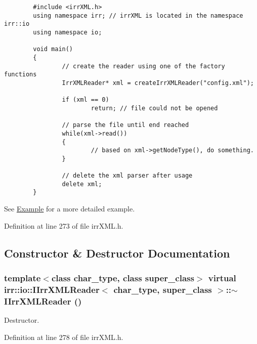 \begin{Code}\begin{verbatim}        #include <irrXML.h>
        using namespace irr; // irrXML is located in the namespace irr::io
        using namespace io;

        void main()
        {
                // create the reader using one of the factory functions
                IrrXMLReader* xml = createIrrXMLReader("config.xml");

                if (xml == 0)
                        return; // file could not be opened

                // parse the file until end reached
                while(xml->read())
                {
                        // based on xml->getNodeType(), do something.
                }

                // delete the xml parser after usage
                delete xml;
        }
\end{verbatim}
\end{Code}

 See \hyperlink{irrXML.h_irrxmlexample}{Example} for a more detailed example. 

Definition at line 273 of file irrXML.h.

\subsection{Constructor \& Destructor Documentation}
\hypertarget{classirr_1_1io_1_1_i_irr_x_m_l_reader_d1d9faeae926afc224d9dea0ad7a08ac}{
\subsubsection[{$\sim$IIrrXMLReader}]{\setlength{\rightskip}{0pt plus 5cm}template$<$class char\_\-type, class super\_\-class$>$ virtual {\bf irr::io::IIrrXMLReader}$<$ char\_\-type, super\_\-class $>$::$\sim${\bf IIrrXMLReader} ()}}
\label{classirr_1_1io_1_1_i_irr_x_m_l_reader_d1d9faeae926afc224d9dea0ad7a08ac}


Destructor. 



Definition at line 278 of file irrXML.h.

